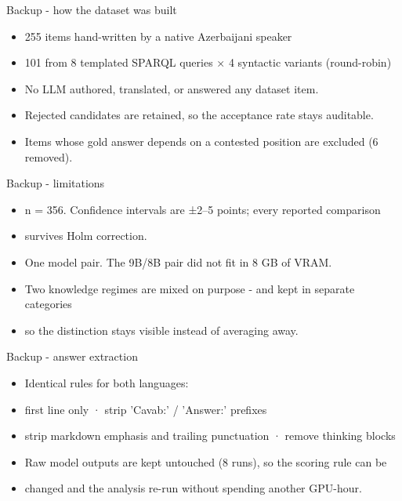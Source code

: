 \documentclass[aspectratio=169,12pt]{beamer}
\begin{document}
\begin{frame}{Backup - how the dataset was built}
\begin{itemize}
  \item[] 255 items hand-written by a native Azerbaijani speaker
  \item[] 101 from 8 templated SPARQL queries × 4 syntactic variants (round-robin)
\vspace{0.25cm}
  \item[] No LLM authored, translated, or answered any dataset item.
  \item[] Rejected candidates are retained, so the acceptance rate stays auditable.
\vspace{0.25cm}
  \item[] Items whose gold answer depends on a contested position are excluded (6 removed).
\end{itemize}
\end{frame}

\begin{frame}{Backup - limitations}
\begin{itemize}
  \item[] n = 356. Confidence intervals are ±2–5 points; every reported comparison
  \item[] survives Holm correction.
\vspace{0.25cm}
  \item[] One model pair. The 9B/8B pair did not fit in 8 GB of VRAM.
\vspace{0.25cm}
  \item[] Two knowledge regimes are mixed on purpose - and kept in separate categories
  \item[] so the distinction stays visible instead of averaging away.
\end{itemize}
\end{frame}

\begin{frame}{Backup - answer extraction}
\begin{itemize}
  \item[] Identical rules for both languages:
\vspace{0.25cm}
  \item[] first line only  ·  strip 'Cavab:' / 'Answer:' prefixes
  \item[] strip markdown emphasis and trailing punctuation  ·  remove thinking blocks
\vspace{0.25cm}
  \item[] Raw model outputs are kept untouched (8 runs), so the scoring rule can be
  \item[] changed and the analysis re-run without spending another GPU-hour.
\end{itemize}
\end{frame}
\end{document}
